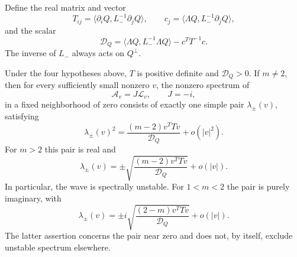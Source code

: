 Define the real matrix and vector
\[
 T_{ij}=\langle\partial_iQ,L_-^{-1}\partial_jQ\rangle,
 \qquad c_j=\langle\Lambda Q,L_-^{-1}\partial_jQ\rangle,
\]
and the scalar
\begin{equation}\label{eq:r11-spectral-D}
 \mathcal D_Q=
 \langle\Lambda Q,L_-^{-1}\Lambda Q\rangle-c^TT^{-1}c.
\end{equation}
The inverse of $L_-$ always acts on $Q^\perp$.

\begin{theorem}
\label{thm:r11-spectral-pair}
Under the four hypotheses above, $T$ is positive definite and
$\mathcal D_Q>0$. If $m\ne2$, then for every sufficiently small nonzero
$v$, the nonzero spectrum of
\[
 \mathcal A_v=J\mathcal L_v,\qquad J=-i,
\]
in a fixed neighborhood of zero consists of exactly one simple pair
$\lambda_\pm(v)$, satisfying
\begin{equation}\label{eq:r11-lambda-square}
 \lambda_\pm(v)^2
  =\frac{(m-2)v^TTv}{\mathcal D_Q}+o(|v|^2).
\end{equation}
For $m>2$ this pair is real and
\[
 \lambda_\pm(v)=
 \pm\sqrt{\frac{(m-2)v^TTv}{\mathcal D_Q}}+o(|v|).
\]
In particular, the wave is spectrally unstable. For $1<m<2$ the pair is
purely imaginary, with
\[
 \lambda_\pm(v)=
 \pm i\sqrt{\frac{(2-m)v^TTv}{\mathcal D_Q}}+o(|v|).
\]
The latter assertion concerns the pair near zero and does not, by itself,
exclude unstable spectrum elsewhere.
\end{theorem}

